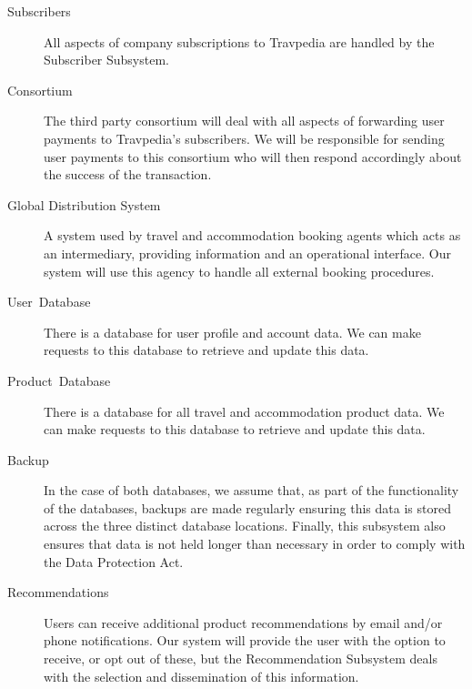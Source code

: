 \begin{description}
	\item [{Subscribers}] All aspects of company subscriptions to Travpedia
		are handled by the Subscriber Subsystem.
	\item [{Consortium}] The third party consortium will deal with all aspects
		of forwarding user payments to Travpedia's subscribers. We will be
		responsible for sending user payments to this consortium who will then
		respond accordingly about the success of the transaction.
	\item [{Global Distribution System}] A system used by travel and
		accommodation booking agents which acts as an intermediary, providing
		information and an operational interface. Our system will use this
		agency to handle all external booking procedures.
	\item [{User~Database}] There is a database for user profile and account
		data. We can make requests to this database to retrieve and update
		this data.
	\item [{Product~Database}] There is a database for all travel and
		accommodation product data. We can make requests to this database to
		retrieve and update this data.
	\item [{Backup}] In the case of both databases, we assume that, as part of
		the functionality of the databases, backups are made regularly ensuring
		this data is stored across the three distinct database locations.
		Finally, this subsystem also ensures that data is not held longer than
		necessary in order to comply with the Data Protection Act.
	\item [{Recommendations}] Users can receive additional product
		recommendations by email and/or phone notifications. Our system will
		provide the user with the option to receive, or opt out of these, but
		the Recommendation Subsystem deals with the selection and dissemination
		of this information.
\end{description}
